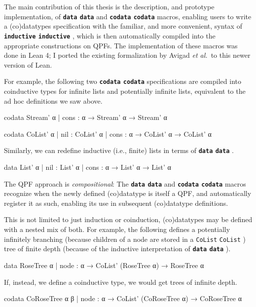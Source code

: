 \documentclass[titlepage]{report}
\newcommand\lean[1]{%
\ifx\leanmode\undefined%
\def\leanmode{1}%
\texttt{\small #1}%
\undef\leanmode%
\else%
\texttt{#1}%
\fi%
}
\newcommand\keyword[1]{{\color{keywordcolor} \textbf{\lean{#1}}}}
\newcommand\inductive{{\keyword{inductive}}}
\newcommand\data{\keyword{data}}
\newcommand\codata{\keyword{codata}}
\newcommand\etal{\emph{et al.}}
\begin{document}
The main contribution of this thesis is the description, and prototype implementation, of \data{} and \codata{} macros, enabling users to write a (co)datatypes specification with the familiar, and more convenient, syntax of \inductive{}, which is then automatically compiled into the appropriate constructions on QPFs.
The implementation of these macros was done in Lean 4; I ported the existing formalization by Avigad \etal\ to this newer version of Lean.


For example, the following two \codata{} specifications are compiled into coinductive types for infinite lists and potentially infinite lists, equivalent to the ad hoc definitions we saw above.

\begin{leancode}
  codata Stream' α
    | cons : α → Stream' α → Stream' α 

  codata CoList' α 
    | nil  : CoList' α
    | cons : α → CoList' α → CoList' α
\end{leancode}

Similarly, we can redefine inductive (i.e., finite) lists in terms of \data{}.

\begin{leancode}
  data List' α 
    | nil  : List' α
    | cons : α → List' α → List' α
\end{leancode}


The QPF approach is \emph{compositional}:
The \data{} and \codata{} macros recognize when the newly defined (co)datatype is itself a QPF, and automatically register it as such, enabling its use in subsequent (co)datatype definitions.



This is not limited to just induction or coinduction, (co)datatypes may be defined with a nested mix of both.
For example, the following defines a potentially infinitely branching (because children of a node are stored in a \lean{CoList}) tree of finite depth (because of the inductive interpretation of \data).

\begin{leancode}
  data RoseTree α
    | node : α → CoList' (RoseTree α) → RoseTree α
\end{leancode}

If, instead, we define a coinductive type, we would get trees of infinite depth.
\begin{leancode}
  codata CoRoseTree α β
    | node : α → CoList' (CoRoseTree α) → CoRoseTree α
\end{leancode}
\end{document}

